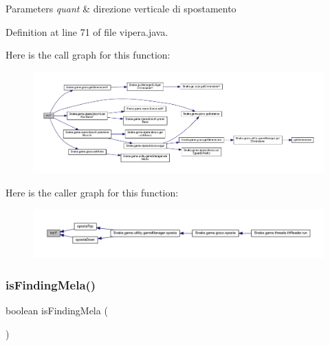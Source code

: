 \begin{DoxyParams}{Parameters}
{\em quant} & direzione verticale di spostamento \\
\hline
\end{DoxyParams}


Definition at line 71 of file vipera.\+java.

Here is the call graph for this function\+:
\nopagebreak
\begin{figure}[H]
\begin{center}
\leavevmode
\includegraphics[width=350pt]{class_snake_1_1game_1_1vipera_1_1vipera_a51a16845a66091ec0697d9ccf8ba4e8d_cgraph}
\end{center}
\end{figure}
Here is the caller graph for this function\+:
\nopagebreak
\begin{figure}[H]
\begin{center}
\leavevmode
\includegraphics[width=350pt]{class_snake_1_1game_1_1vipera_1_1vipera_a51a16845a66091ec0697d9ccf8ba4e8d_icgraph}
\end{center}
\end{figure}
\mbox{\label{class_snake_1_1game_1_1vipera_1_1vipera_ad36cea66da3e5e8f3a9fdd8decd6f70b}} 
\subsubsection{\texorpdfstring{is\+Finding\+Mela()}{isFindingMela()}}
{\footnotesize\ttfamily boolean is\+Finding\+Mela (\begin{DoxyParamCaption}{ }\end{DoxyParamCaption})}




